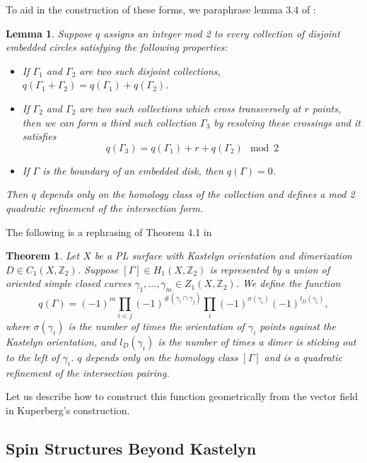 \documentclass{article}
\def\bZ{\mathbb{Z}}
\newtheorem{thm}{Theorem}
\newtheorem{lemma}{Lemma}
\theoremstyle{definition}
\begin{document}
To aid in the construction of these forms, we paraphrase lemma 3.4 of \cite{KirbyTaylor}:
\begin{lemma} Suppose $q$ assigns an integer mod 2 to every collection of disjoint embedded circles satisfying the following properties:
\begin{itemize}
    \item If $\Gamma_1$ and $\Gamma_2$ are two such disjoint collections, $q(\Gamma_1 + \Gamma_2) = q(\Gamma_1) + q(\Gamma_2)$.
    \item If $\Gamma_2$ and $\Gamma_2$ are two such collections which cross transversely at $r$ points, then we can form a third such collection $\Gamma_3$ by resolving these crossings and it satisfies
    \[q(\Gamma_3) = q(\Gamma_1) + r + q(\Gamma_2) \mod 2\]
    \item If $\Gamma$ is the boundary of an embedded disk, then $q(\Gamma) = 0$.
\end{itemize}

Then $q$ depends only on the homology class of the collection and defines a mod 2 quadratic refinement of the intersection form.

\end{lemma}



The following is a rephrasing of Theorem 4.1 in \cite{Cimasoni}
\begin{thm}
Let $X$ be a PL surface with Kastelyn orientation and dimerization $D \in C_1(X,\bZ_2)$. Suppose $[\Gamma] \in H_1(X,\bZ_2)$ is represented by a union of oriented simple closed curves $\gamma_1 ,\ldots,\gamma_m \in Z_1(X,\bZ_2)$. We define the function
\[q(\Gamma) = (-1)^m \prod_{i<j} (-1)^{\#(\gamma_i \cap \gamma_j)} \prod_i (-1)^{\sigma(\gamma_i)} (-1)^{l_D(\gamma_i)},\]
where $\sigma(\gamma_i)$ is the number of times the orientation of $\gamma_i$ points against the Kastelyn orientation, and $l_D(\gamma_i)$ is the number of times a dimer is sticking out to the left of $\gamma_i$. $q$ depends only on the homology class $[\Gamma]$ and is a quadratic refinement of the intersection pairing.
\end{thm}

Let us describe how to construct this function geometrically from the vector field in Kuperberg's construction.

\subsection{Spin Structures Beyond Kastelyn}
\end{document}

